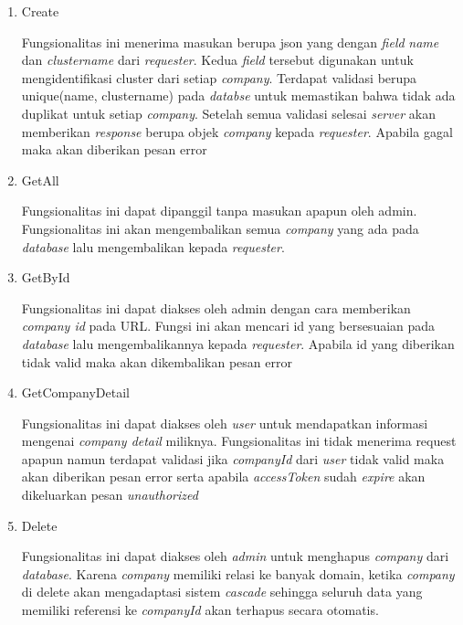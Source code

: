 \begin{enumerate}
  \item Create

        Fungsionalitas ini menerima masukan berupa json yang dengan \textit{field} \textit{name} dan \textit{cluster\textunderscore name} dari \textit{requester}. Kedua \textit{field} tersebut digunakan untuk mengidentifikasi cluster dari setiap \textit{company}. Terdapat validasi berupa unique(name, cluster\textunderscore name) pada \textit{databse} untuk memastikan bahwa tidak ada duplikat untuk setiap \textit{company}. Setelah semua validasi selesai \textit{server} akan memberikan \textit{response} berupa objek \textit{company} kepada \textit{requester}. Apabila gagal maka akan diberikan pesan error

  \item GetAll

        Fungsionalitas ini dapat dipanggil tanpa masukan apapun oleh admin. Fungsionalitas ini akan mengembalikan semua \textit{company} yang ada pada \textit{database} lalu mengembalikan kepada \textit{requester}.

  \item GetById

        Fungsionalitas ini dapat diakses oleh admin dengan cara memberikan \textit{company id} pada URL. Fungsi ini akan mencari id yang bersesuaian pada \textit{database} lalu mengembalikannya kepada \textit{requester}. Apabila id yang diberikan tidak valid maka akan dikembalikan pesan error

  \item GetCompanyDetail

        Fungsionalitas ini dapat diakses oleh \textit{user} untuk mendapatkan informasi mengenai \textit{company detail} miliknya. Fungsionalitas ini tidak menerima request apapun namun terdapat validasi jika \textit{companyId} dari \textit{user} tidak valid maka akan diberikan pesan error serta apabila \textit{accessToken} sudah \textit{expire} akan dikeluarkan pesan \textit{unauthorized}

  \item Delete

        Fungsionalitas ini dapat diakses oleh \textit{admin} untuk menghapus \textit{company} dari \textit{database}. Karena \textit{company} memiliki relasi ke banyak domain, ketika \textit{company} di delete akan mengadaptasi sistem \textit{cascade} sehingga seluruh data yang memiliki referensi ke \textit{companyId} akan terhapus secara otomatis.

\end{enumerate}



